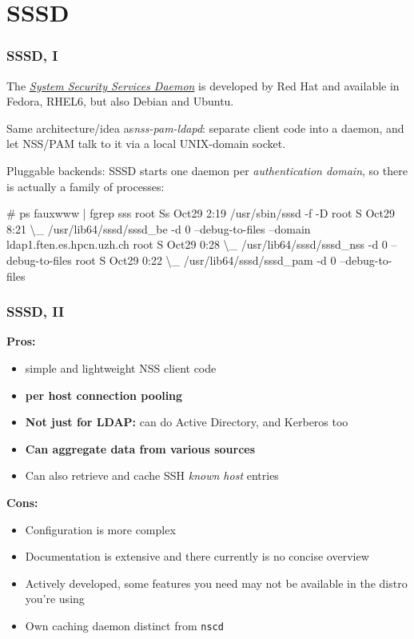 \documentclass[english,serif,mathserif,usenames,dvipsnames]{beamer}
\begin{document}
\section{SSSD}
\begin{frame}[fragile]
  \frametitle{SSSD, I}
  The \href{https://fedorahosted.org/sssd/}{\emph{System Security
      Services Daemon}} is developed by Red Hat and available in
  Fedora, RHEL6, but also Debian and Ubuntu.

  \+
  Same architecture/idea as\emph{nss-pam-ldapd}: separate client code
  into a daemon, and let NSS/PAM talk to it via a local UNIX-domain
  socket.

  \+
  Pluggable backends: SSSD starts one daemon per
  \emph{authentication domain}, so there is actually a family of
  processes:
\begin{semiverbatim}\tiny
# ps fauxwww | fgrep sss
root     Ss   Oct29   2:19 /usr/sbin/sssd -f -D
root     S    Oct29   8:21  \textbackslash\_ /usr/lib64/sssd/sssd_be -d 0 --debug-to-files --domain ldap1.ften.es.hpcn.uzh.ch
root     S    Oct29   0:28  \textbackslash\_ /usr/lib64/sssd/sssd_nss -d 0 --debug-to-files
root     S    Oct29   0:22  \textbackslash\_ /usr/lib64/sssd/sssd_pam -d 0 --debug-to-files
\end{semiverbatim}
\end{frame}


\begin{frame}
  \frametitle{SSSD, II}
  \textbf{Pros:}
  \begin{itemize}
  \item simple and lightweight NSS client code
  \item \textbf{per host connection pooling}
  \item \textbf{Not just for LDAP:} can do Active Directory, and Kerberos too
  \item \textbf{Can aggregate data from various sources}
  \item Can also retrieve and cache SSH \emph{known host} entries
  \end{itemize}

  \textbf{Cons:}
  \begin{itemize}
  \item Configuration is more complex
  \item Documentation is extensive and there currently is no concise overview
  \item Actively developed, some features you need may not be
    available in the distro you're using
  \item Own caching daemon distinct from \texttt{nscd}
  \end{itemize}
\end{frame}
\end{document}
